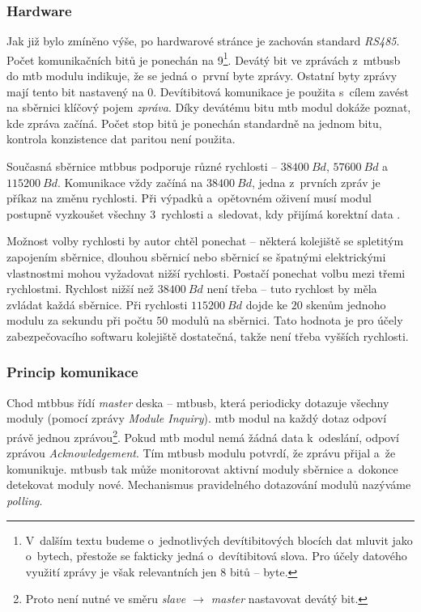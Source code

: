 \subsubsection{Hardware}

Jak již bylo zmíněno výše, po hardwarové stránce je zachován standard
\textit{RS485}. Počet komunikačních bitů je ponechán na 9\footnote{
V~dalším textu budeme o~jednotlivých devítibitových blocích dat mluvit jako
o~bytech, přestože se fakticky jedná o~devítibitová slova. Pro účely datového
využití zprávy je však relevantních jen 8 bitů – byte.}.
Devátý bit ve zprávách z~\gls{mtbusb} do \gls{mtb} modulu indikuje, že
se jedná o~první byte zprávy. Ostatní byty zprávy mají tento bit nastavený na
0. Devítibitová komunikace je použita s~cílem zavést na sběrnici klíčový pojem
\textit{zpráva}. Díky devátému bitu \gls{mtb} modul dokáže poznat, kde zpráva
začíná. Počet stop bitů je ponechán standardně na jednom bitu, kontrola
konzistence dat paritou není použita.

Současná sběrnice \gls{mtbbus} podporuje různé rychlosti – $38400~Bd$,
$57600~Bd$ a $115200~Bd$. Komunikace vždy začíná na $38400~Bd$, jedna z~prvních
zpráv je příkaz na změnu rychlosti. Při výpadků a~opětovném oživení musí modul
postupně vyzkoušet všechny 3~rychlosti a~sledovat, kdy přijímá korektní data
\cite{mtbbus-specs}.

Možnost volby rychlosti by autor chtěl ponechat – některá kolejiště se
spletitým zapojením sběrnice, dlouhou sběrnicí nebo sběrnicí se špatnými
elektrickými vlastnostmi mohou vyžadovat nižší rychlosti. Postačí ponechat
volbu mezi třemi rychlostmi.
Rychlost nižší než $38400~Bd$ není třeba – tuto rychlost by měla
zvládat každá sběrnice. Při rychlosti $115200~Bd$ dojde ke $20$ skenům
jednoho modulu za sekundu při počtu $50$ modulů na sběrnici. Tato hodnota je
pro účely zabezpečovacího softwaru kolejiště dostatečná, takže není
třeba vyšších rychlosti.


\subsubsection{Princip komunikace}

Chod \gls{mtbbus} řídí \textit{master} deska – \gls{mtbusb},
která periodicky dotazuje všechny moduly (pomocí zprávy
\textit{Module Inquiry}). \gls{mtb} modul na každý dotaz odpoví právě jednou
zprávou\footnote{Proto není nutné ve směru \textit{slave $\rightarrow$ master}
nastavovat devátý bit.}.  Pokud \gls{mtb} modul nemá žádná data k~odeslání,
odpoví zprávou \textit{Acknowledgement}. Tím \gls{mtbusb} modulu potvrdí, že
zprávu přijal a~že komunikuje. \gls{mtbusb} tak může monitorovat aktivní moduly
sběrnice a~dokonce detekovat moduly nové. Mechanismus pravidelného dotazování
modulů nazýváme \textit{polling}.

